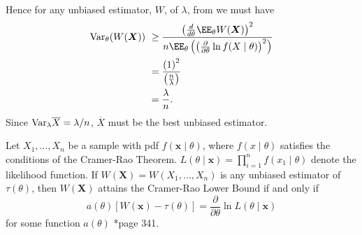 \begin{exam}
\begin{align*}
    \end{align*}
    Hence for any unbiased estimator, $W$, of $\lambda$, from  we must have
    \begin{align*}
        \Var_{\theta} (W(\bm{X})) \
         & \geq \frac{\left( \frac{d}{d \theta} \EE_{\theta} W(\bm{X}) \right)^2}{n \EE_{\theta} \left( \left( \frac{\partial}{\partial \theta} \ln f(X \mid \theta)  \right)^2 \right)} \\
         & = \frac{\left( 1 \right)^2}{\left( \frac{n}{\lambda} \right)}                                                                                                                 \\
         & = \frac{\lambda}{n}.
    \end{align*}
    Since ${\operatorname{Var}}_{\lambda} \overline{X} = \lambda / n$, $\overline{X}$ must be the best unbiased estimator.
\end{exam}

\begin{cor}[Attainment] \label{cor: cri_attainment}
    Let $X_1 , \ldots , X_n$ be a sample with pdf $f(\bm{x} \mid \theta)$, where $f(x \mid \theta)$ satisfies the conditions of the Cramer-Rao Theorem. $L(\theta \mid \bm{x}) = \prod_{i=1}^{n} f(x_1 \mid \theta)$ denote the likelihood function. If $W(\bm{X}) = W(X_1 , \ldots , X_n)$ is any unbiased estimator of $\tau (\theta)$, then $W(\bm{X})$ attains the Cramer-Rao Lower Bound if and only if
    \begin{equation*}
        a(\theta) \left[ W(\bm{x}) - \tau (\theta) \right] = \frac{\partial}{\partial \theta} \ln L (\theta \mid \bm{x})
    \end{equation*}
    for some function $a(\theta)$ \cite{CasellaGeorge2001SI}*{page 341}.
\end{cor}

